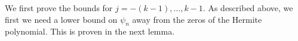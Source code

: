 \documentclass[12pt, reqno]{amsart}
\theoremstyle{definition}
\numberwithin{equation}{section}
\begin{document}
We first prove the bounds for  $j=-(k-1),\ldots,k-1$. As described above, we first we need a lower bound on  $\psi_n$ away from the zeros of the Hermite polynomial. This is proven in the next lemma.



\end{document}
